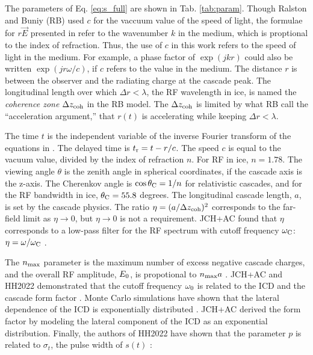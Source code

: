 \documentclass[amsmath,amssymb,aps,prd,10pt,twocolumn,showkeys]{revtex4}
\begin{document}
The parameters of Eq. \ref{eq:s_full} are shown in Tab. \ref{tab:param}.  Though Ralston and Buniy (RB) \cite{10.1103/physrevd.65.016003} used $c$ for the vaccuum value of the speed of light, the formulae for $r \vec{E}$ presented in \cite{10.1103/physrevd.65.016003} refer to the wavenumber $k$ in the medium, which is proptional to the index of refraction. Thus, the use of $c$ in this work refers to the speed of light in the medium.  For example, a phase factor of $\exp(j k r)$ could also be written $\exp(j r \omega/c)$, if $c$ refers to the value in the medium.  The distance $r$ is between the observer and the radiating charge at the cascade peak.  The longitudinal length over which $\Delta r < \lambda$, the RF wavelength in ice, is named the \textit{coherence zone} $\Delta z_{\rm coh}$ in the RB model.  The $\Delta z_{\rm coh}$ is limited by what RB call the ``acceleration argument,'' that $r(t)$ is accelerating while keeping $\Delta r < \lambda$.

The time $t$ is the independent variable of the inverse Fourier transform of the equations in \cite{10.1103/physrevd.65.016003}. The delayed time is $t_{\rm r} = t-r/c$.  The speed $c$ is equal to the vacuum value, divided by the index of refraction $n$.  For RF in ice, $n=1.78$.  The viewing angle $\theta$ is the zenith angle in spherical coordinates, if the cascade axis is the z-axis.  The Cherenkov angle is $\cos\theta_{\rm C} = 1/n$ for relativistic cascades, and for the RF bandwidth in ice, $\theta_{\rm C} = 55.8$ degrees.  The longitudinal cascade length, $a$, is set by the cascade physics.  The ratio $\eta = (a/\Delta z_{\rm coh})^2$ corresponds to the far-field limit as $\eta \to 0$, but $\eta \to 0$ is not a requirement.  JCH+AC found that $\eta$ corresponds to a low-pass filter for the RF spectrum with cutoff frequency $\omega_{\rm C}$: $\eta = \omega/\omega_{\rm C}$ \cite{10.1016/j.astropartphys.2017.03.008}.

The $n_{\rm max}$ parameter is the maximum number of excess negative cascade charges, and the overall RF amplitude, $E_{\rm 0}$, is propotional to $n_{\rm max} a$ \cite{10.1103/physrevd.65.016003}.  JCH+AC and HH2022 demonstrated that the cutoff frequency $\omega_{\rm 0}$ is related to the ICD and the cascade form factor \cite{10.1016/j.astropartphys.2017.03.008,PhysRevD.105.123019}.  Monte Carlo simulations have shown that the lateral dependence of the ICD is exponentially distributed \cite{zhs,10.1016/j.astropartphys.2017.03.008}.  JCH+AC derived the form factor by modeling the lateral component of the ICD as an exponential distribution.  Finally, the authors of HH2022 have shown that the parameter $p$ is related to $\sigma_t$, the pulse width of $s(t)$ \cite{PhysRevD.105.123019}:
\end{document}
